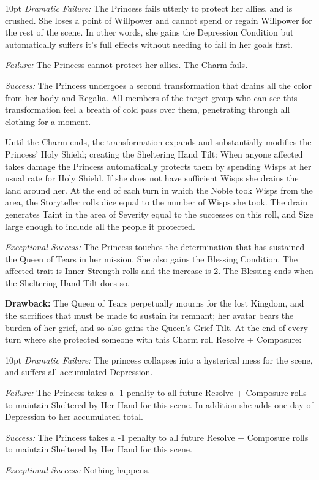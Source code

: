 \begin{myindentpar}{10pt}    \emph{Dramatic Failure:} The Princess fails utterly to protect her allies, and is crushed. She loses a point of Willpower and cannot spend or regain Willpower for the rest of the scene. In other words, she gains the Depression Condition but automatically suffers it's full effects without needing to fail in her goals first. 

    \emph{Failure:} The Princess cannot protect her allies. The Charm fails.

    \emph{Success:} The Princess undergoes a second transformation that drains all the color from her body and Regalia. All members of the target group who can see this transformation feel a breath of cold pass over them, penetrating through all clothing for a moment. 
    
    Until the Charm ends, the transformation expands and substantially modifies the Princess' Holy Shield; creating the Sheltering Hand Tilt: When anyone affected takes damage the Princess automatically protects them by spending Wisps at her usual rate for Holy Shield. If she does not have sufficient Wisps she drains the land around her. At the end of each turn in which the Noble took Wisps from the area, the Storyteller rolls dice equal to the number of Wisps she took. The drain generates Taint in the area of Severity equal to the successes on this roll, and Size large enough to include all the people it protected.
    

    \emph{Exceptional Success:} The Princess touches the determination that has sustained the Queen of Tears in her mission. She also gains the Blessing Condition. The affected trait is Inner Strength rolls and the increase is 2. The Blessing ends when the Sheltering Hand Tilt does so.\end{myindentpar}

\noindent \textbf{Drawback:} The Queen of Tears perpetually mourns for the lost Kingdom, and the sacrifices that must be made to sustain its remnant; her avatar bears the burden of her grief, and so also gains the Queen's Grief Tilt. At the end of every turn where she protected someone with this Charm roll Resolve + Composure: 

   \begin{myindentpar}{10pt}   \emph{Dramatic Failure:} The princess collapses into a hysterical mess for the scene, and suffers all accumulated Depression.
    
    \emph{Failure:} The Princess takes a -1 penalty to all future Resolve + Composure rolls to maintain Sheltered by Her Hand for this scene. In addition she adds one day of Depression to her accumulated total. 

    \emph{Success:} The Princess takes a -1 penalty to all future Resolve + Composure rolls to maintain Sheltered by Her Hand for this scene.

    \emph{Exceptional Success:} Nothing happens. \end{myindentpar}

